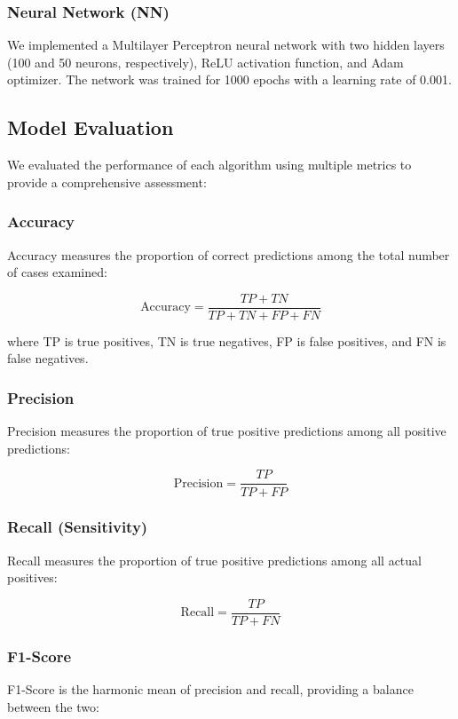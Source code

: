 \documentclass[conference]{IEEEtran}
\begin{document}
\subsubsection{Neural Network (NN)}
We implemented a Multilayer Perceptron neural network with two hidden layers (100 and 50 neurons, respectively), ReLU activation function, and Adam optimizer. The network was trained for 1000 epochs with a learning rate of 0.001.

\subsection{Model Evaluation}
We evaluated the performance of each algorithm using multiple metrics to provide a comprehensive assessment:

\subsubsection{Accuracy}
Accuracy measures the proportion of correct predictions among the total number of cases examined:

\begin{equation}
\text{Accuracy} = \frac{TP + TN}{TP + TN + FP + FN}
\end{equation}

where TP is true positives, TN is true negatives, FP is false positives, and FN is false negatives.

\subsubsection{Precision}
Precision measures the proportion of true positive predictions among all positive predictions:

\begin{equation}
\text{Precision} = \frac{TP}{TP + FP}
\end{equation}

\subsubsection{Recall (Sensitivity)}
Recall measures the proportion of true positive predictions among all actual positives:

\begin{equation}
\text{Recall} = \frac{TP}{TP + FN}
\end{equation}

\subsubsection{F1-Score}
F1-Score is the harmonic mean of precision and recall, providing a balance between the two:
\end{document}
